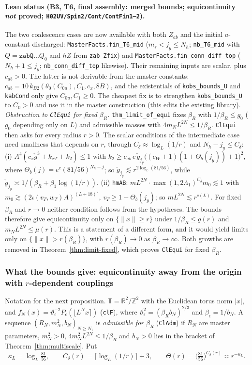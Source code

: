 \documentclass[11pt]{amsart}
\theoremstyle{definition}
\theoremstyle{remark}
\numberwithin{equation}{section}
\newcommand{\Z}{\mathbb{Z}}
\newcommand{\R}{\mathbb{R}}
\newcommand{\T}{\mathbb{T}}
\begin{document}
\paragraph{Lean status (B3, T6, final assembly: merged bounds; equicontinuity \emph{not} proved; \texttt{H02UV/Spin2/Cont/ContFin1--2}).}
The two coalescence cases are now available with both $Z_{ab}$ and the initial $a$-constant discharged:
\texttt{MasterFacts.fin\_T6\_mid} ($m_s<j_y\le N_h$; \texttt{nb\_T6\_mid} with $Q=\texttt{zabQ}\dots Q_0$ and $hZ$ from
\texttt{zab\_Zfix}) and \texttt{MasterFacts.fin\_conn\_diff\_top} ($N_h+1\le j_y$; \texttt{nb\_conn\_diff\_top} likewise).
Their remaining inputs are scalar, plus $c_{ab}>0$. The latter is not derivable from the master constants:
$c_{ab}=10\,k_{B2}(\theta_0(C_{0u}),C_1,c_x,8B)$, and the existentials of \texttt{kobs\_bounds\_U} and \texttt{kabCond}
only give $C_{0u},C_1\ge0$. The cheapest fix is to strengthen \texttt{kobs\_bounds\_U} to $C_0>0$ and use it in the master
construction (this edits the existing library).
\emph{Obstruction to \texttt{ClEqui} for fixed $\beta_R$.} \texttt{thm\_limit\_of\_equi} fixes $\beta_R$ with
$1/\beta_R\le g_0$ ($g_0$ depending only on $L$) and admissible masses with $4m_NL^{2N}\le1/\beta_R$. \texttt{ClEqui} then asks
for every radius $r>0$. The scalar conditions of the intermediate case need smallness that depends on $r$, through
$C_\delta\approx\log_L(1/r)$ and $N_h-j_y\le C_\delta$:
(i) $A^4(c_x\check g^3+k_{xT}+k_2)\le1$ with $k_2\ge c_{ab}\,c\,\check g_{j_y}\bigl((c_W+1)(1+\Theta_b(j_y))+1\bigr)^2$,
where $\Theta_b(j)=e^{c}(81/56)^{N_h-j}$; so $\check g_{j_y}\lesssim r^{2\log_L(81/56)}$, while
$\check g_{j_y}\asymp1/(\beta_R+\beta_1\log(1/r))$.
(ii) \texttt{hmAB}: $m L^{2N}\cdot\max(1,2\Lambda_1)^{C_\delta}m_0\lesssim1$ with
$m_0\gtrsim(2\iota(v_T,w_T)A)^{(L+18)^2}$, $v_T\ge1+\Theta_b(j_y)$; so $mL^{2N}\lesssim r^{c(L)}$.
For fixed $\beta_R$ and $r\to0$ neither condition follows from the hypotheses. The bounds therefore give
equicontinuity only on $\{\|x\|\ge r\}$ under $1/\beta_R\le g(r)$ and $m_NL^{2N}\le\mu(r)$. This is a statement of a
different form, and it would yield limits only on $\{\|x\|>r(\beta_R)\}$, with $r(\beta_R)\to0$ as $\beta_R\to\infty$.
Both growths are removed in Theorem~\ref{thm:limit-fixed}, which proves \texttt{ClEqui} for fixed $\beta_R$.

\subsubsection*{What the bounds give: equicontinuity away from the origin with $r$-dependent couplings}
Notation for the next proposition. $\T=\R^2/\Z^2$ with the Euclidean torus norm $|x|$, and
$f_N(x)=\vartheta_\epsilon^{-2}P_\epsilon(\lfloor L^Nx\rceil)$ (\texttt{clF}), where
$\vartheta_\epsilon^2=(\beta_Rb_N)^{2/3}$ and $\beta_\epsilon=1/b_N$. A sequence $(R_N,m_N^2,b_N)_{N\ge N_1}$ is
\emph{admissible for $\beta_R$} (\texttt{ClAdm}) if $R_N$ are master parameters, $m_N^2>0$, $4m_N^2L^{2N}\le1/\beta_R$ and
$b_N>0$ lies in the bracket of Theorem~\ref{thm:multiscale}. Put
\[
\kappa_L=\log_L\tfrac{81}{56},\qquad C_\delta(r)=\lceil\log_L(1/r)\rceil+3,\qquad
\Theta(r)=\bigl(\tfrac{81}{56}\bigr)^{C_\delta(r)}\asymp r^{-\kappa_L}.
\]
\end{document}
